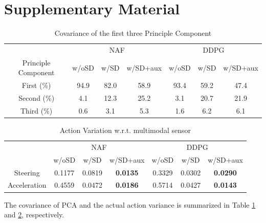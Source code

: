 \documentclass[../thesis.tex]{subfiles}
\begin{document}

\section{Supplementary Material}



\begin{table}[t]
    \vskip 0.1in
    \caption{Covariance of the first three Principle Component}
    \label{table:pca-3-covariance}
    \vskip 0.1in
    \centering
    \begin{small}
    \begin{sc}
    \begin{tabular}{c|ccc|ccc}
    \toprule 
    \centering
     & \multicolumn{3}{c}{NAF} & \multicolumn{3}{c}{DDPG}  \\
     Principle Component & w/oSD & w/SD & w/SD+aux & w/oSD & w/SD & w/SD+aux \\ \midrule \midrule
     First (\%) & 94.9  &  82.0  &  58.9 & 
                93.4  &  59.2  &  47.4 \\
     Second  (\%) & 4.1  &  12.3  &  25.2 & 
                    3.1  &  20.7  &  21.9 \\ 
    Third  (\%) & 0.6  &  3.1  &  5.3 & 
                1.6  &  6.2  &  6.1 \\ \toprule
    \end{tabular}
    \end{sc}
    \end{small}
\end{table}

\begin{table}[t]
    \vskip 0.1in
    \caption{Action Variation w.r.t. multimodal sensor}
    \label{table:pca-action-variance}
    \vskip 0.1in
    \centering
    \begin{small}
    \begin{sc}
    \begin{tabular}{c|ccc|ccc}
    \toprule 
    \centering
     & \multicolumn{3}{c}{NAF} & \multicolumn{3}{c}{DDPG}  \\
     & w/oSD & w/SD & w/SD+aux & w/oSD & w/SD & w/SD+aux \\ \midrule \midrule
     Steering & 0.1177  &  0.0819  &  \textbf{0.0135} & 
                0.3329  &  0.0302  &  \textbf{0.0290} \\
     Acceleration & 0.4559  &  0.0472  &  \textbf{0.0186} & 
                    0.5714  &  0.0427  &  \textbf{0.0143} \\ \toprule
    \end{tabular}
    \end{sc}
    \end{small}
\end{table}

The covariance of PCA and the actual action variance is summarized in Table \ref{table:pca-3-covariance} and \ref{table:pca-action-variance}, respectively.
\end{document}
